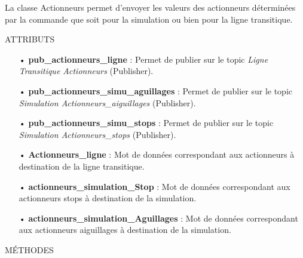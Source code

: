 \documentclass[a4paper,french, titlepage]{book}
\begin{document}
La classe Actionneurs permet d'envoyer les valeurs des actionneurs déterminées par la commande que soit pour la simulation ou bien pour la ligne transitique.

\begin{center}
ATTRIBUTS
\end{center}



\begin{itemize}
\item[•] \textbf{pub\_actionneurs\_ligne} : Permet de publier sur le topic \emph{Ligne Transitique Actionneurs} (Publisher).
\item[•] \textbf{pub\_actionneurs\_simu\_aguillages} : Permet de publier sur le topic \emph{Simulation Actionneurs\_aiguillages} (Publisher).
\item[•] \textbf{pub\_actionneurs\_simu\_stops} : Permet de publier sur le topic \emph{Simulation Actionneurs\_stops} (Publisher).
\item[•] \textbf{Actionneurs\_ligne} : Mot de données correspondant aux actionneurs à destination de la ligne transitique.
\item[•] \textbf{actionneurs\_simulation\_Stop} : Mot de données correspondant aux actionneurs stops à destination de la simulation.
\item[•] \textbf{actionneurs\_simulation\_Aguillages} : Mot de données correspondant aux actionneurs aiguillages à destination de la simulation.
\end{itemize}

\begin{center}
MÉTHODES
\end{center}
\end{document}
